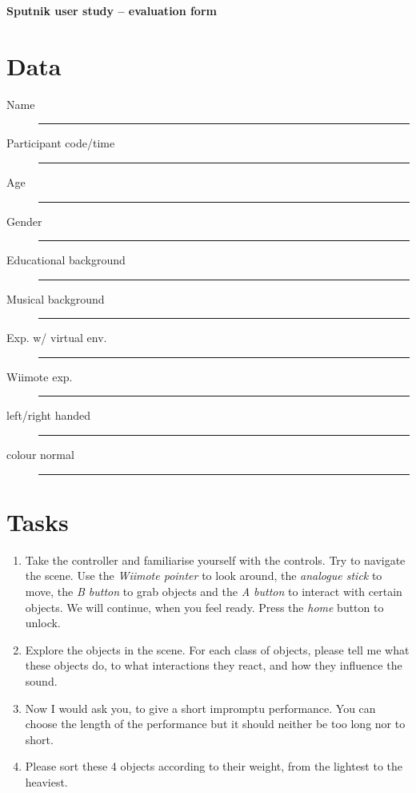 \documentclass[10pt,a4paper]{scrartcl}
\begin{document}
\begin{center}
  \textbf{\huge Sputnik user study -- evaluation form}
\end{center}

\section{Data}
\begin{description}
\item[Name] \rule{\linewidth}{0.25pt}
\item[Participant code/time] \rule{\linewidth}{0.25pt}
\item[Age] \rule{\linewidth}{0.25pt}
\item[Gender] \rule{\linewidth}{0.25pt}
\item[Educational background] \rule{\linewidth}{0.25pt}
\item[Musical background] \rule{\linewidth}{0.25pt}
\item[Exp. w/ virtual env.] \rule{\linewidth}{0.25pt}
\item[Wiimote exp.] \rule{\linewidth}{0.25pt}
\item[left/right handed] \rule{\linewidth}{0.25pt}
\item[colour normal] \rule{\linewidth}{0.25pt}
\end{description}

\section{Tasks}
\begin{enumerate}

\item Take the controller and familiarise yourself with the controls. Try to navigate the scene. Use the \emph{Wiimote pointer} to look around, the \emph{analogue stick} to move, the \emph{B button} to grab objects and the \emph{A button} to interact with certain objects. We will continue, when you feel ready. Press the \emph{home} button to unlock.

\item Explore the objects in the scene. For each class of objects, please tell me what these objects do, to what interactions they react, and how they influence the sound.

\item Now I would ask you, to give a short impromptu performance. You can choose the length of the performance but it should neither be too long nor to short.

\item Please sort these 4 objects according to their weight, from the lightest to the heaviest.
\end{enumerate}
\end{document}
